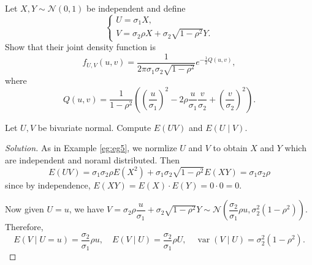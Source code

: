 \documentclass[11pt,singlecolumn, openany, citestyle=authoryear]{elegantbook}
\begin{document}
\begin{CJK}{UTF8}{gbsn}
\begin{example}\label{eg:eg5}
    Let $X,Y\sim\mathcal{N}(0,1)$ be independent and define 
    $$
    \begin{cases}
        U=\sigma_1 X,\\
        V=\sigma_2\rho X + \sigma_2 \sqrt{1-\rho^2}Y.
    \end{cases}
    $$
    Show that their joint density function is
    $$
    f_{U,V}(u,v)=\frac{1}{2\pi\sigma_1\sigma_2\sqrt{1-\rho^2}}e^{-\frac{1}{2}Q(u,v)},
    $$
    where 
    $$
    Q(u,v)=\frac{1}{1-\rho^2}\left(
        \left(\frac{u}{\sigma_1}\right)^2 - 2\rho \frac{u}{\sigma_1}\frac{v}{\sigma_2}
        +\left(\frac{v}{\sigma_2}\right)^2
    \right).
    $$
\end{example}
\begin{example}
    Let $U,V$ be bivariate normal. Compute $E(UV)$ and $E(U\mid V)$.
\end{example}
\begin{proof}[Solution]
    As in Example \ref{eg:eg5}, we normlize $U$ and $V$ to obtain 
    $X$ and $Y$ which are independent and noraml distributed. Then 
    $$
    E(UV)=\sigma_1\sigma_2\rho E(X^2) + \sigma_1\sigma_2\sqrt{1-\rho^2}E(XY)=\sigma_1\sigma_2
    \rho
    $$
    since by independence, $E(XY)=E(X)\cdot E(Y)=0\cdot 0 =0$.

    Now given $U=u$, we have $V =\sigma_2\rho\dfrac{u}{\sigma_1}+\sigma_2\sqrt{1-\rho^2}Y 
    \sim\mathcal{N}\left(\dfrac{\sigma_2}{\sigma_1}\rho u,\sigma_2^2(1-\rho^2)\right)$.
    Therefore,
    $$
    E(V\mid U=u)=\frac{\sigma_2}{\sigma_1}\rho u,\quad 
    E(V\mid U)=\frac{\sigma_2}{\sigma_1}\rho U,\quad 
    \operatorname*{var}(V\mid U)=\sigma_2^2(1-\rho^2).
    $$
\end{proof}


\end{CJK}
\end{document}
